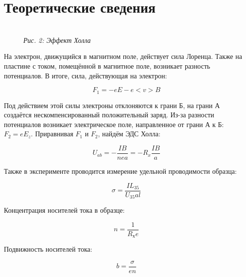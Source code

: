 \newpage

\section{Теоретические сведения}

\begin{figure}[h!]
    \\
    \textit{Рис. 2: Эффект Холла}
\end{figure}

\noindent На электрон, движущийся в магнитном поле, действует сила Лоренца. Также на пластине с током, помещённой в магнитное поле, возникает разность потенциалов. В итоге, сила, действующая на электрон:

\begin{equation}
    F_1 = -eE - e<v>B
\end{equation}

\noindent Под действием этой силы электроны отклоняются к грани Б, на грани \linebreak А создаётся нескомпенсированный положительный заряд. Из-за разности потенциалов возникает электрическое поле, направленное от грани А к Б: $F_2 = eE_z$. Приравнивая $F_1$ и $F_2$, найдём ЭДС Холла:

\begin{equation}
    U_{ab} = - \frac{IB}{nea} = -R_x \frac{IB}{a}
\end{equation}

\noindent Также в эксперименте проводится измерение удельной проводимости образца:

\begin{equation}
    \sigma = \frac{I L_{35}}{U_{35} a l}
\end{equation}

\noindent Концентрация носителей тока в образце:

\begin{equation}
n = \frac{1}{R_\text{х} e}
\end{equation}

\noindent Подвижность носителей тока:

\begin{equation}
    b = \frac{\sigma}{en}
\end{equation}
